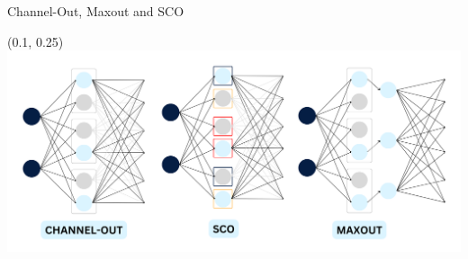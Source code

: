 \documentclass[UKenglish]{beamer}
\begin{document}
\begin{frame}{Channel-Out, Maxout and SCO}
    \vspace{0.5cm}
    \center
    \begin{textblock}{0.8}(0.1, 0.25)
        \includegraphics[width = \textwidth]{figures/EnsembleComp}
    \end{textblock}
\end{frame}
\end{document}
